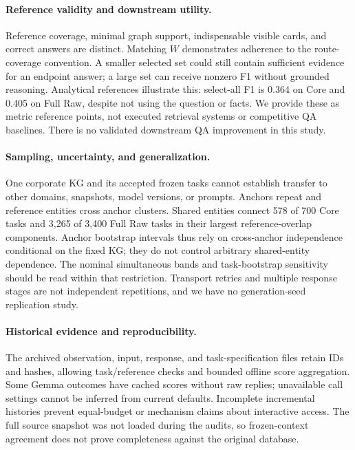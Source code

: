 \paragraph{Reference validity and downstream utility.}
Reference coverage, minimal graph support, indispensable visible cards, and correct answers are distinct. Matching $W$ demonstrates adherence to the route-coverage convention. A smaller selected set could still contain sufficient evidence for an endpoint answer; a large set can receive nonzero F1 without grounded reasoning. Analytical references illustrate this: select-all F1 is 0.364 on Core and 0.405 on Full Raw, despite not using the question or facts. We provide these as metric reference points, not executed retrieval systems or competitive QA baselines. There is no validated downstream QA improvement in this study.

\paragraph{Sampling, uncertainty, and generalization.}
One corporate KG and its accepted frozen tasks cannot establish transfer to other domains, snapshots, model versions, or prompts. Anchors repeat and reference entities cross anchor clusters. Shared entities connect 578 of 700 Core tasks and 3,265 of 3,400 Full Raw tasks in their largest reference-overlap components. Anchor bootstrap intervals thus rely on cross-anchor independence conditional on the fixed KG; they do not control arbitrary shared-entity dependence. The nominal simultaneous bands and task-bootstrap sensitivity should be read within that restriction. Transport retries and multiple response stages are not independent repetitions, and we have no generation-seed replication study.

\paragraph{Historical evidence and reproducibility.}
The archived observation, input, response, and task-specification files retain IDs and hashes, allowing task/reference checks and bounded offline score aggregation. Some Gemma outcomes have cached scores without raw replies; unavailable call settings cannot be inferred from current defaults. Incomplete incremental histories prevent equal-budget or mechanism claims about interactive access. The full source snapshot was not loaded during the audits, so frozen-context agreement does not prove completeness against the original database.

